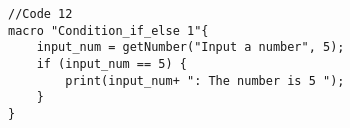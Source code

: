 \begin{lstlisting}[morekeywords={*, if}]
//Code 12
macro "Condition_if_else 1"{
	input_num = getNumber("Input a number", 5);
	if (input_num == 5) {
		print(input_num+ ": The number is 5 ");
	} 
}

\end{lstlisting}